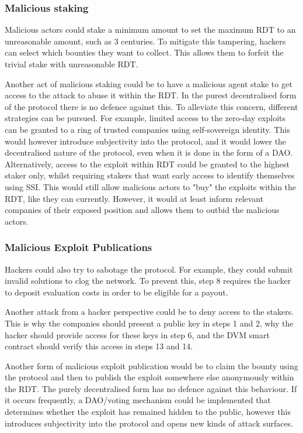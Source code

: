 \subsubsection{Malicious staking}
Malicious actors could stake a minimum amount to set the maximum RDT to an unreasonable amount, such as 3 centuries. To mitigate this tampering, hackers can select which bounties they want to collect. This allows them to forfeit the trivial stake with unreasonable RDT.

Another act of malicious staking could be to have a malicious agent stake to get access to the attack to abuse it within the RDT. In the purest decentralised form of the protocol there is no defence against this.  To alleviate this concern, different strategies can be pursued. For example, limited access to the zero-day exploits can be granted to a ring of trusted companies using self-sovereign identity. This would however introduce subjectivity into the protocol, and it would lower the decentralised nature of the protocol, even when it is done in the form of a DAO. Alternatively, access to the exploit within RDT could be granted to the highest staker only, whilst requiring stakers that want early access to identify themselves using SSI. This would still allow malicious actors to "buy" the exploits within the RDT, like they can currently. However, it would at least inform relevant companies of their exposed position and allows them to outbid the malicious actors.
\subsubsection{Malicious Exploit Publications}
Hackers could also try to sabotage the protocol. For example, they could submit invalid solutions to clog the network. To prevent this, step 8 requires the hacker to deposit evaluation costs in order to be eligible for a payout.

Another attack from a hacker perspective could be to deny access to the stakers. This is why the companies should present a public key in steps 1 and 2, why the hacker should provide access for these keys in step 6, and the DVM smart contract should verify this access in steps 13 and 14.

Another form of malicious exploit publication would be to claim the bounty using the protocol and then to publish the exploit somewhere else anonymously within the RDT. The purely decentralised form has no defence against this behaviour. If it occurs frequently, a DAO/voting mechanism could be implemented that determines whether the exploit has remained hidden to the public, however this introduces subjectivity into the protocol and opens new kinds of attack surfaces.

